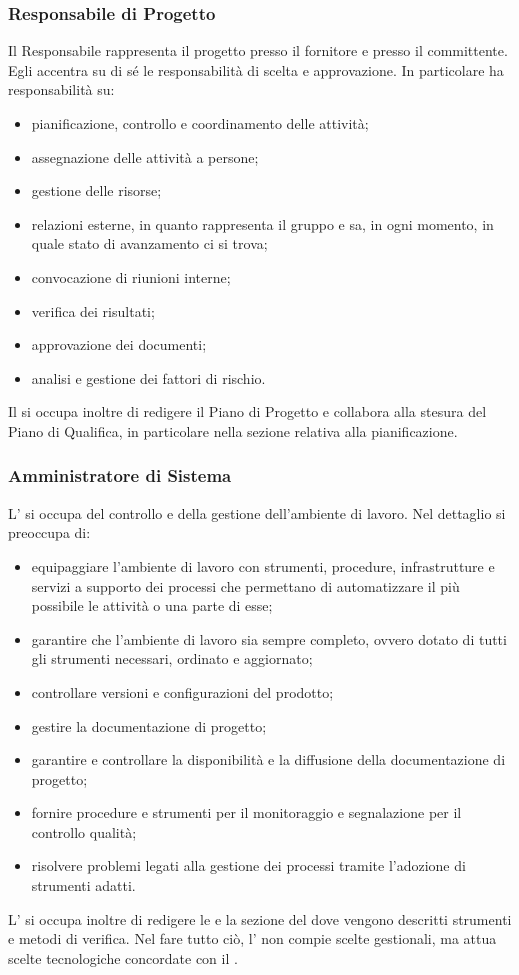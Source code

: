 		\subsubsection{Responsabile di Progetto}
			Il Responsabile rappresenta il progetto presso il fornitore e presso il committente. Egli accentra su di sé le responsabilità di scelta e approvazione. In particolare ha responsabilità su:
			\begin{itemize}
				\item pianificazione, controllo e coordinamento delle attività;
				\item assegnazione delle attività a persone;
				\item gestione delle risorse;
				\item relazioni esterne, in quanto rappresenta il gruppo e sa, in ogni momento, in quale stato di avanzamento ci si trova;
				\item convocazione di riunioni interne;
				\item verifica dei risultati;
				\item approvazione dei documenti;
				\item analisi e gestione dei fattori di rischio.
			\end{itemize}
			Il  si occupa inoltre di redigere il Piano di Progetto e collabora alla stesura del Piano di Qualifica, in particolare nella sezione relativa alla pianificazione.
		\subsubsection{Amministratore di Sistema}
			L' si occupa del controllo e della gestione dell'ambiente di lavoro. Nel dettaglio si preoccupa di:
			\begin{itemize}
				\item equipaggiare l'ambiente di lavoro con strumenti, procedure, infrastrutture e servizi a supporto dei processi che permettano di automatizzare il più possibile le attività o una parte di esse;
				\item garantire che l’ambiente di lavoro sia sempre completo, ovvero dotato di tutti gli strumenti necessari, ordinato e aggiornato;
				\item controllare versioni e configurazioni del prodotto;
				\item gestire la documentazione di progetto;
				\item garantire e controllare la disponibilità e la diffusione della documentazione di progetto;
				\item fornire procedure e strumenti per il monitoraggio e segnalazione per il controllo qualità;
				\item risolvere problemi legati alla gestione dei processi tramite l'adozione di strumenti adatti.
			\end{itemize}
			L' si occupa inoltre di redigere le  e la sezione del  dove vengono descritti strumenti e metodi di verifica. Nel fare tutto ciò, l' non compie scelte gestionali, ma attua scelte tecnologiche concordate con il .
